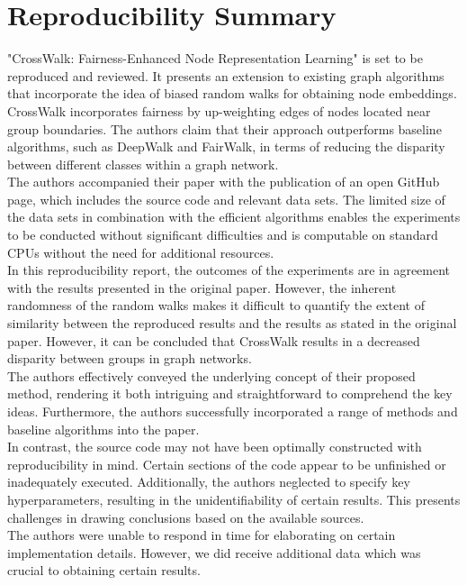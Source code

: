 \section*{\centering Reproducibility Summary}
\vspace{-3mm}
"CrossWalk: Fairness-Enhanced Node Representation Learning" is set to be reproduced and reviewed. It presents an extension to existing graph algorithms that incorporate the idea of biased random walks for obtaining node embeddings. CrossWalk incorporates fairness by up-weighting edges of nodes located near group boundaries. The authors claim that their approach outperforms baseline algorithms, such as DeepWalk and FairWalk, in terms of reducing the disparity between different classes within a graph network. \\

The authors accompanied their paper with the publication of an open GitHub page, which includes the source code and relevant data sets. The limited size of the data sets in combination with the efficient algorithms enables the experiments to be conducted without significant difficulties and is computable on standard CPUs without the need for additional resources.\\

In this reproducibility report, the outcomes of the experiments are in agreement with the results presented in the original paper. However, the inherent randomness of the random walks makes it difficult to quantify the extent of similarity between the reproduced results and the results as stated in the original paper. However, it can be concluded that CrossWalk results in a decreased disparity between groups in graph networks.\\

The authors effectively conveyed the underlying concept of their proposed method, rendering it both intriguing and straightforward to comprehend the key ideas. Furthermore, the authors successfully incorporated a range of methods and baseline algorithms into the paper.\\

In contrast, the source code may not have been optimally constructed with reproducibility in mind. Certain sections of the code appear to be unfinished or inadequately executed. Additionally, the authors neglected to specify key hyperparameters, resulting in the unidentifiability of certain results. This presents challenges in drawing conclusions based on the available sources.\\

The authors were unable to respond in time for elaborating on certain implementation details. However, we did receive additional data which was crucial to obtaining certain results.

